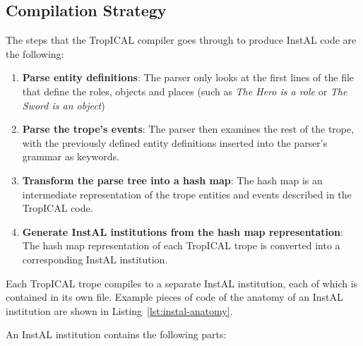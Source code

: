 \documentclass[11pt]{report}
\begin{document}
\subsection{Compilation Strategy}

The steps that the TropICAL compiler goes through to produce InstAL code are the
following:

\begin{enumerate}
\item \textbf{Parse entity definitions}: The parser only looks at the first
  lines of the file that define the roles, objects and places (such as \emph{The
    Hero is a role} or \emph{The Sword is an object})
\item \textbf{Parse the trope's events}: The parser then examines the rest of
  the trope, with the previously defined entity definitions inserted into the
  parser's grammar as keywords.
\item \textbf{Transform the parse tree into a hash map}: The hash map is an
  intermediate representation of the trope entities and events described in the
  TropICAL code.
\item \textbf{Generate InstAL institutions from the hash map representation}:
  The hash map representation of each TropICAL trope is converted into a corresponding InstAL institution.
\end{enumerate}

Each TropICAL trope compiles to a separate InstAL institution, each of which is
contained in its own file. Example pieces of code of the anatomy of an InstAL institution are
shown in Listing~\ref{lst:instal-anatomy}. 

An InstAL institution contains the following parts:
\end{document}
